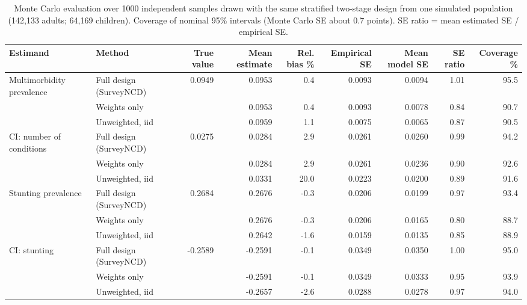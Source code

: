 \begin{table}

\caption{\label{tab:tab_simulation}Monte Carlo evaluation over 1000 independent samples drawn with the same stratified two-stage design from one simulated population (142,133 adults; 64,169 children). Coverage of nominal 95\% intervals (Monte Carlo SE about 0.7 points). SE ratio = mean estimated SE / empirical SE.}
\centering
\begin{tabular}[t]{llrrrrrrr}
\toprule
Estimand & Method & True value & Mean estimate & Rel. bias \% & Empirical SE & Mean model SE & SE ratio & Coverage \%\\
\midrule
Multimorbidity prevalence & Full design (SurveyNCD) & 0.0949 & 0.0953 & 0.4 & 0.0093 & 0.0094 & 1.01 & 95.5\\
 & Weights only &  & 0.0953 & 0.4 & 0.0093 & 0.0078 & 0.84 & 90.7\\
 & Unweighted, iid &  & 0.0959 & 1.1 & 0.0075 & 0.0065 & 0.87 & 90.5\\
CI: number of conditions & Full design (SurveyNCD) & 0.0275 & 0.0284 & 2.9 & 0.0261 & 0.0260 & 0.99 & 94.2\\
 & Weights only &  & 0.0284 & 2.9 & 0.0261 & 0.0236 & 0.90 & 92.6\\
 & Unweighted, iid &  & 0.0331 & 20.0 & 0.0223 & 0.0200 & 0.89 & 91.6\\
Stunting prevalence & Full design (SurveyNCD) & 0.2684 & 0.2676 & -0.3 & 0.0206 & 0.0199 & 0.97 & 93.4\\
 & Weights only &  & 0.2676 & -0.3 & 0.0206 & 0.0165 & 0.80 & 88.7\\
 & Unweighted, iid &  & 0.2642 & -1.6 & 0.0159 & 0.0135 & 0.85 & 88.9\\
CI: stunting & Full design (SurveyNCD) & -0.2589 & -0.2591 & -0.1 & 0.0349 & 0.0350 & 1.00 & 95.0\\
 & Weights only &  & -0.2591 & -0.1 & 0.0349 & 0.0333 & 0.95 & 93.9\\
 & Unweighted, iid &  & -0.2657 & -2.6 & 0.0288 & 0.0278 & 0.97 & 94.0\\
\bottomrule
\end{tabular}
\end{table}
